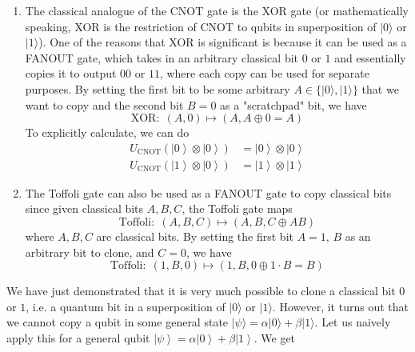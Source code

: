 \documentclass{article}
\newcommand{\ket}[1]{\ensuremath{\left|#1\right\rangle}}
\begin{document}
    \begin{enumerate}
      \item The classical analogue of the CNOT gate is the XOR gate (or mathematically speaking, XOR is the restriction of CNOT to qubits in superposition of $|0\rangle$ or $|1\rangle$). One of the reasons that XOR is significant is because it can be used as a FANOUT gate, which takes in an arbitrary classical bit $0$ or $1$ and essentially copies it to output $00$ or $11$, where each copy can be used for separate purposes. By setting the first bit to be some arbitrary $A \in \{|0\rangle, |1\rangle\}$ that we want to copy and the second bit $B = 0$ as a "scratchpad" bit, we have 
      \begin{equation} 
        \text{XOR}: \; (A, 0) \mapsto (A, A \oplus 0 = A)
      \end{equation}
      To explicitly calculate, we can do 
      \begin{align} 
        U_{\mathrm{CNOT}} (\ket{0} \otimes \ket{0}) & = \ket{0} \otimes \ket{0} \\
        U_{\mathrm{CNOT}} (\ket{1} \otimes \ket{0}) & = \ket{1} \otimes \ket{1}
      \end{align}

      \item The Toffoli gate can also be used as a FANOUT gate to copy classical bits since given classical bits $A, B, C$, the Toffoli gate maps 
      \begin{equation} 
        \text{Toffoli}: \; (A, B, C) \mapsto (A, B, C \oplus A B)
      \end{equation}
      where $A, B, C$ are classical bits. By setting the first bit $A = 1$, $B$ as an arbitrary bit to clone, and $C=0$, we have 
      \begin{equation} 
        \text{Toffoli}: \; (1, B, 0) \mapsto (1, B, 0 \oplus 1\cdot B = B)
      \end{equation}
    \end{enumerate}

    We have just demonstrated that it is very much possible to clone a classical bit $0$ or $1$, i.e. a quantum bit in a superposition of $|0\rangle$ or $|1\rangle$. However, it turns out that we cannot copy a qubit in some general state $|\psi\rangle = \alpha |0\rangle + \beta |1\rangle$. Let us naively apply this for a general qubit $\ket{\psi} = \alpha \ket{0} + \beta \ket{1}$. We get
\end{document}
